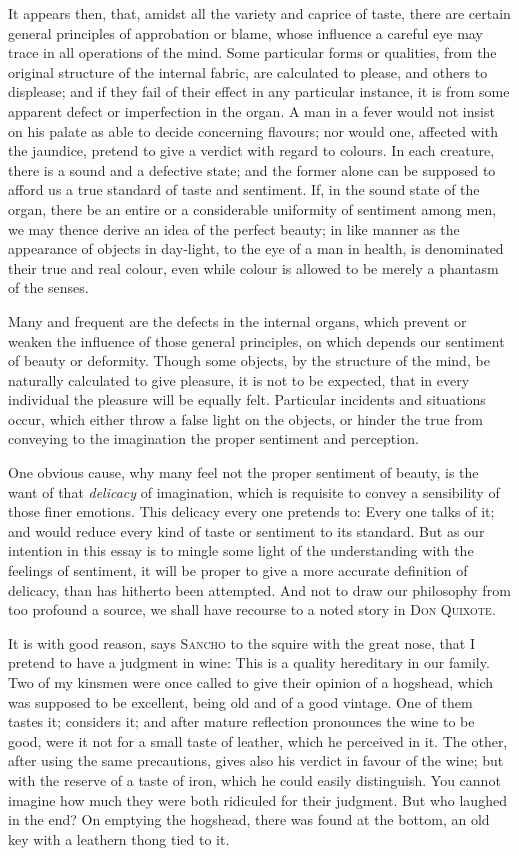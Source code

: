 It appears then, that, amidst all the variety and caprice of taste,
there are certain general principles of approbation or blame, whose
influence a careful eye may trace in all operations of the mind. Some
particular forms or qualities, from the original structure of the
internal fabric, are calculated to please, and others to displease;
and if they fail of their effect in any particular instance, it is
from some apparent defect or imperfection in the organ. A man in a
fever would not insist on his palate as able to decide concerning
flavours; nor would one, affected with the jaundice, pretend to give a
verdict with regard to colours. In each creature, there is a
 sound and a defective state; and the former alone can be
supposed to afford us a true standard of taste and sentiment. If, in
the sound state of the organ, there be an entire or a considerable
uniformity of sentiment among men, we may thence derive an idea of the
perfect beauty; in like manner as the appearance of objects in
day-light, to the eye of a man in health, is denominated their true
and real colour, even while colour is allowed to be merely a phantasm
of the senses.

Many and frequent are the defects in the internal organs, which
prevent or weaken the influence of those general principles, on which
depends our sentiment of beauty or deformity. Though some objects, by
the structure of the mind, be naturally calculated to give pleasure,
it is not to be expected, that in every individual the pleasure will
be equally felt. Particular incidents and situations occur, which
either throw a false light on the objects, or hinder the true from
conveying to the imagination the proper sentiment and perception.

One obvious cause, why many feel not the proper sentiment of beauty,
is the want of that \textit{delicacy} of imagination, which is
requisite to convey a sensibility of those finer emotions. This
delicacy every one pretends to: Every one talks of it; and would
reduce every kind of taste or sentiment to its standard. But as our
intention in this essay is to mingle some light of the understanding
with the feelings of sentiment, it will be proper to give a more
accurate definition of delicacy, than has hitherto been attempted. And
not to draw our philosophy from too profound a source, we shall have
recourse to a noted story in \textsc{Don Quixote}.

It is with good reason, says \textsc{Sancho} to the squire with the
great nose, that I pretend to have a judgment in wine: This is a
quality hereditary in our family. Two of my kinsmen were once called
to give their opinion of a hogshead, which was supposed to be
excellent, being old and of a good vintage. One of them tastes it;
considers it; and after mature reflection pronounces the wine to be
good, were it not for a small taste of leather, which he perceived in
it. The other, after using the same precautions, gives also his
verdict in favour of the wine; but with the reserve of a taste of
iron, which he could easily distinguish. You cannot imagine how much
they were both ridiculed for their judgment. But who laughed in the
end? On emptying the hogshead, there was found at the bottom, an old
key with a leathern thong tied to it.

